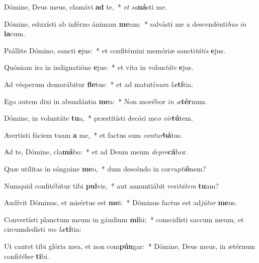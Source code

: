 \item Dómine, Deus meus, clamávi \textbf{ad} te,~* \textit{et} \textit{sa}\textbf{ná}sti me.
\item Dómine, eduxísti ab inférno ánimam \textbf{me}am:~* salvásti me a descendénti\textit{bus} \textit{in} \textbf{la}cum.
\item Psállite Dómino, sancti \textbf{e}jus:~* et confitémini memóriæ sancti\textit{tátis} \textbf{e}jus.
\item Quóniam ira in indignatióne \textbf{e}jus:~* et vita in volun\textit{táte} \textbf{e}jus.
\item Ad vésperum demorábitur \textbf{fle}tus:~* et ad matutí\textit{num} \textit{læ}\textbf{tí}tia.
\item Ego autem dixi in abundántia \textbf{me}a:~* Non movébor \textit{in} \textit{æ}\textbf{tér}num.
\item Dómine, in voluntáte \textbf{tu}a,~* præstitísti decóri me\textit{o} \textit{vir}\textbf{tú}tem.
\item Avertísti fáciem tuam \textbf{a} me,~* et factus sum \textit{contur}\textbf{bá}tus.
\item Ad te, Dómine, cla\textbf{má}bo:~* et ad Deum meum \textit{depre}\textbf{cá}bor.
\item Quæ utílitas in sánguine \textbf{me}o,~* dum descéndo in cor\textit{rupti}\textbf{ó}nem?
\item Numquid confitébitur tibi \textbf{pul}vis,~* aut annuntiábit veri\textit{tátem} \textbf{tu}am?
\item Audívit Dóminus, et misértus est \textbf{me}i:~* Dóminus factus est ad\textit{jútor} \textbf{me}us.
\item Convertísti planctum meum in gáudium \textbf{mi}hi:~* conscidísti saccum meum, et circumdedísti \textit{me} \textit{læ}\textbf{tí}tia:
\item Ut cantet tibi glória mea, et non com\textbf{pún}gar:~* Dómine, Deus meus, in ætérnum confi\textit{tébor} \textbf{ti}bi.
